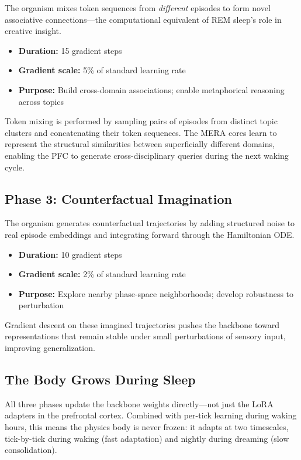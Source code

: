 \documentclass[11pt,a4paper,twocolumn]{article}
\begin{document}
The organism mixes token sequences from \emph{different} episodes to form novel associative connections---the computational equivalent of REM sleep's role in creative insight.
\begin{itemize}
\item \textbf{Duration:} 15 gradient steps
\item \textbf{Gradient scale:} 5\% of standard learning rate
\item \textbf{Purpose:} Build cross-domain associations; enable metaphorical reasoning across topics
\end{itemize}
Token mixing is performed by sampling pairs of episodes from distinct topic clusters and concatenating their token sequences.
The MERA cores learn to represent the structural similarities between superficially different domains, enabling the PFC to generate cross-disciplinary queries during the next waking cycle.

\subsection{Phase 3: Counterfactual Imagination}

The organism generates counterfactual trajectories by adding structured noise to real episode embeddings and integrating forward through the Hamiltonian ODE.
\begin{itemize}
\item \textbf{Duration:} 10 gradient steps
\item \textbf{Gradient scale:} 2\% of standard learning rate
\item \textbf{Purpose:} Explore nearby phase-space neighborhoods; develop robustness to perturbation
\end{itemize}
Gradient descent on these imagined trajectories pushes the backbone toward representations that remain stable under small perturbations of sensory input, improving generalization.

\subsection{The Body Grows During Sleep}

All three phases update the backbone weights directly---not just the LoRA adapters in the prefrontal cortex.
Combined with per-tick learning during waking hours, this means the physics body is never frozen: it adapts at two timescales, tick-by-tick during waking (fast adaptation) and nightly during dreaming (slow consolidation).
\end{document}
